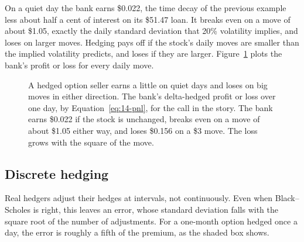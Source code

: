 On a quiet day the bank earns \$0.022, the time decay of the previous example less about half a cent of interest on its \$51.47 loan. It breaks even on a move of about \$1.05, exactly the daily standard deviation that 20\% volatility implies, and loses on larger moves. Hedging pays off if the stock's daily moves are smaller than the implied volatility predicts, and loses if they are larger. Figure~\ref{fig:14-pnl} plots the bank's profit or loss for every daily move.

\begin{figure}[htbp]
\centering
{}
\caption{A hedged option seller earns a little on quiet days and loses on big moves in either direction. The bank's delta-hedged profit or loss over one day, by Equation~\eqref{eq:14-pnl}, for the call in the story. The bank earns \$0.022 if the stock is unchanged, breaks even on a move of about \$1.05 either way, and loses \$0.156 on a \$3 move. The loss grows with the square of the move.}
\label{fig:14-pnl}
\end{figure}


\subsection{Discrete hedging}

Real hedgers adjust their hedges at intervals, not continuously. Even when Black--Scholes is right, this leaves an error, whose standard deviation falls with the square root of the number of adjustments. For a one-month option hedged once a day, the error is roughly a fifth of the premium, as the shaded box shows.

